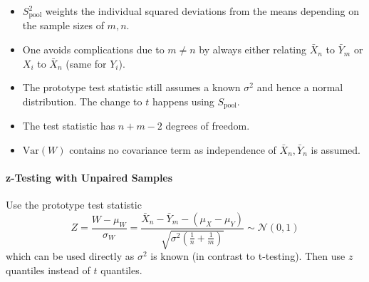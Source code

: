 \begin{itemize}
    \item $S_{\text{pool}}^2$ weights the individual squared deviations from the means depending on the sample sizes of $m,n$.
    \item One avoids complications due to $m \neq n$ by always either relating $\bar{X}_n$ to $\bar{Y}_m$ or $X_i$ to $\bar{X}_n$ (same for $Y_i$).
    \item The prototype test statistic still assumes a known $\sigma^2$ and hence a normal distribution. The change to $t$ happens using $S_\text{pool}$.
    \item The test statistic has $n+m-2$ degrees of freedom.
    \item $\mathrm{Var}(W)$ contains no covariance term as independence of $\bar{X}_n,\bar{Y}_n$ is assumed.
\end{itemize}

\paragraph{z-Testing with Unpaired Samples}

Use the prototype test statistic
\begin{equation*}
    Z = \frac{W-\mu_W}{\sigma_W}=\frac{\bar{X}_n-\bar{Y}_m-(\mu_X-\mu_Y)}{\sqrt{\sigma^2\left(\frac{1}{n}+\frac{1}{m}\right)}}\sim\mathcal{N}(0,1)
\end{equation*}
which can be used directly as $\sigma^2$ is known (in contrast to t-testing).
Then use $z$ quantiles instead of $t$ quantiles.